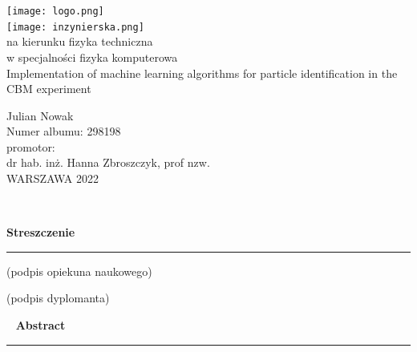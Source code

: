 \pagestyle{empty}

\begin{titlepage}
	
\begin{minipage}{\textwidth}
	\begin{center}
		\texttt{[image: logo.png]} \\
			\vspace{3cm}
		\texttt{[image: inzynierska.png]} \\ %
			\vspace{1.5cm}
  			na kierunku fizyka techniczna \\
			w specjalności fizyka komputerowa \\
			\vspace{2cm}	
		{\Large
			Implementation of machine learning algorithms for particle identification in the CBM experiment}

			\vspace{2cm}	
		{\huge
			Julian Nowak} \\
			Numer albumu: 298198 \\
			\vspace{1.5cm}	
			promotor: \\
			dr hab. inż. Hanna Zbroszczyk, prof nzw. \\
			\vspace{3cm}
			WARSZAWA 2022		
	\end{center}
\end{minipage}

\end{titlepage}

\newpage
\mbox{ }

\newpage
{\large \textbf{Streszczenie}}\\
{\color{sliwka}\rule[1pt]{\textwidth}{1.5pt}}




\vspace{2cm}

\begin{multicols}{2}
	\begin{flushleft}
		(podpis opiekuna naukowego)
	\end{flushleft}
	\begin{flushright}
		(podpis dyplomanta)
	\end{flushright}
\end{multicols}

\newpage
\mbox{ }
\newpage
{\large \textbf{Abstract}}\\
{\color{sliwka}\rule[1pt]{\textwidth}{1.5pt}}


